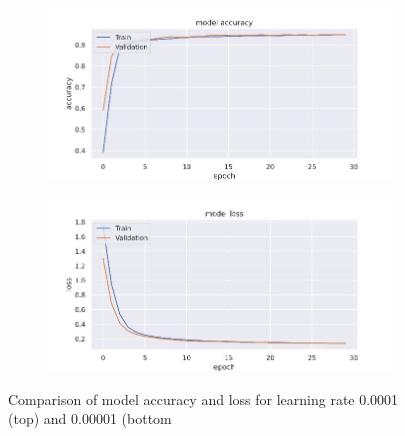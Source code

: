 \begin{figure}
    \begin{subfigure}[b]{0.2\textwidth}
        \includegraphics[width=\textwidth]{figures/lr/3.jpg}
    \end{subfigure}
    \begin{subfigure}[b]{0.2\textwidth}
        \includegraphics[width=\textwidth]{figures/lr/4.jpg}
    \end{subfigure}
    \caption{\centering
    Comparison of model accuracy and loss  for learning rate 0.0001 (top) and 0.00001 (bottom}
    \label{fig:lr_s}
\end{figure}